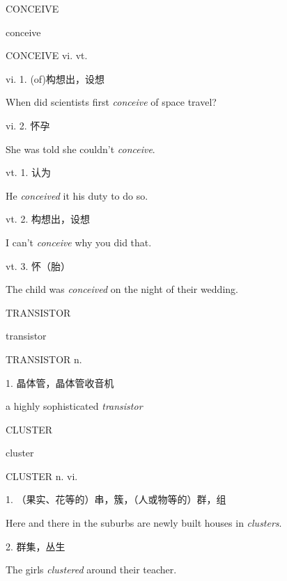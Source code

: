 \begin{flashcard}{
CONCEIVE

conceive
}
\begin{center}
CONCEIVE vi. vt. 
\end{center}
\normalsize vi. 1. (of)构想出，设想

\footnotesize When did scientists first \textit{conceive} of space travel?

\normalsize vi. 2. 怀孕

\footnotesize She was told she couldn't \textit{conceive}.

\normalsize vt. 1. 认为

\footnotesize He \textit{conceived} it his duty to do so.

\normalsize vt. 2. 构想出，设想

\footnotesize I can't \textit{conceive} why you did that.

\normalsize vt. 3. 怀（胎）

\footnotesize The child was \textit{conceived} on the night of their wedding.

\end{flashcard}
\begin{flashcard}{
TRANSISTOR

transistor
}
\begin{center}
TRANSISTOR n. 
\end{center}
1. 晶体管，晶体管收音机

a highly sophisticated \textit{transistor}

\end{flashcard}
\begin{flashcard}{
CLUSTER

cluster
}
\begin{center}
CLUSTER n. vi. 
\end{center}
1. （果实、花等的）串，簇，（人或物等的）群，组

Here and there in the suburbs are newly built houses in \textit{clusters}.

2. 群集，丛生

The girls \textit{clustered} around their teacher.

\end{flashcard}
